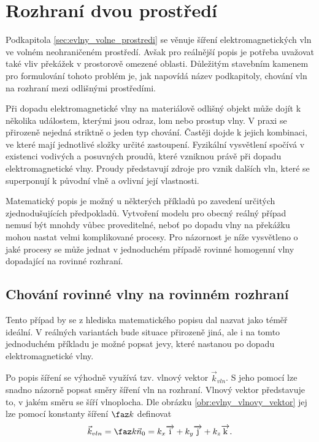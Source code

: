 \section{Rozhraní dvou prostředí} \label{sec:evlny_rozhrani_dvou_prostredi}
Podkapitola \ref{sec:evlny_volne_prostredi} se věnuje šíření elektromagnetických vln ve volném neohraničeném prostředí. Avšak pro reálnější popis je potřeba uvažovat také vliv překážek v prostorově omezené oblasti. Důležitým stavebním kamenem pro formulování tohoto problém je, jak napovídá název podkapitoly, chování vln na rozhraní mezi odlišnými prostředími.

Při dopadu elektromagnetické vlny na materiálově odlišný objekt může dojít k několika událostem, kterými jsou odraz, lom nebo prostup vlny. V praxi se přirozeně nejedná striktně o jeden typ chování. Častěji dojde k jejich kombinaci, ve které mají jednotlivé složky určité zastoupení. Fyzikální vysvětlení spočívá v existenci vodivých a posuvných proudů, které vzniknou právě při dopadu elektromagnetické vlny. Proudy představují zdroje pro vznik dalších vln, které se superponují k původní vlně a ovlivní její vlastnosti. 

Matematický popis je možný u některých příkladů po zavedení určitých zjednodušujících předpokladů. Vytvoření modelu pro obecný reálný případ nemusí být mnohdy vůbec proveditelné, neboť po dopadu vlny na překážku mohou nastat velmi komplikované procesy. Pro názornost je níže vysvětleno o jaké procesy se může jednat v jednoduchém případě rovinné homogenní vlny dopadající na rovinné rozhraní.

\subsection*{Chování rovinné vlny na rovinném rozhraní}
Tento případ by se z hlediska matematického popisu dal nazvat jako téměř ideální. V reálných variantách bude situace přirozeně jiná, ale i na tomto jednoduchém příkladu je možné popsat jevy, které nastanou po dopadu elektromagnetické vlny. 

Po popis šíření se výhodně využívá tzv. vlnový vektor $\vec k_{vln}$. S jeho pomocí lze snadno názorně popsat směry šíření vln na rozhraní. Vlnový vektor představuje to, v jakém směru se šíří vlnoplocha. Dle obrázku \ref{obr:evlny_vlnovy_vektor} jej lze pomocí konstanty šíření $\faz k$ definovat
\begin{equation}
	\vec k_{vln} = \faz k \vec n_{0} = k_{x}\overrightarrow{\mathrm{i}} + k_{y}\overrightarrow{\mathrm{j}} + k_{z}\overrightarrow{\mathrm{k}}.
	\label{rce:evlny_vlnovy_vektor}
\end{equation}

